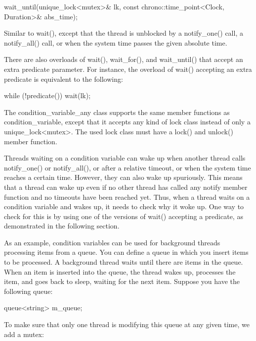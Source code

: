 \begin{cpp}
wait_until(unique_lock<mutex>& lk, const chrono::time_point<Clock, Duration>& abs_time);
\end{cpp}

Similar to wait(), except that the thread is unblocked by a notify\_one() call, a notify\_all() call, or when the system time passes the given absolute time.

There are also overloads of wait(), wait\_for(), and wait\_until() that accept an extra predicate parameter. For instance, the overload of wait() accepting an extra predicate is equivalent to the following:

\begin{cpp}
while (!predicate())
    wait(lk);
\end{cpp}

The condition\_variable\_any class supports the same member functions as condition\_variable, except that it accepts any kind of lock class instead of only a unique\_lock<mutex>. The used lock class must have a lock() and unlock() member function.


Threads waiting on a condition variable can wake up when another thread calls notify\_one() or notify\_all(), or after a relative timeout, or when the system time reaches a certain time. However, they can also wake up spuriously. This means that a thread can wake up even if no other thread has called any notify member function and no timeouts have been reached yet. Thus, when a thread waits on a condition variable and wakes up, it needs to check why it woke up. One way to check for this is by using one of the versions of wait() accepting a predicate, as demonstrated in the following section.


As an example, condition variables can be used for background threads processing items from a queue. You can define a queue in which you insert items to be processed. A background thread waits until there are items in the queue. When an item is inserted into the queue, the thread wakes up, processes the item, and goes back to sleep, waiting for the next item. Suppose you have the following queue:

\begin{cpp}
queue<string> m_queue;
\end{cpp}

To make sure that only one thread is modifying this queue at any given time, we add a mutex:

